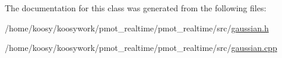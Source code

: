 \-The documentation for this class was generated from the following files\-:\begin{DoxyCompactItemize}
\item 
/home/koosy/koosywork/pmot\-\_\-realtime/pmot\-\_\-realtime/src/\hyperlink{gaussian_8h}{gaussian.\-h}\item 
/home/koosy/koosywork/pmot\-\_\-realtime/pmot\-\_\-realtime/src/\hyperlink{gaussian_8cpp}{gaussian.\-cpp}\end{DoxyCompactItemize}

